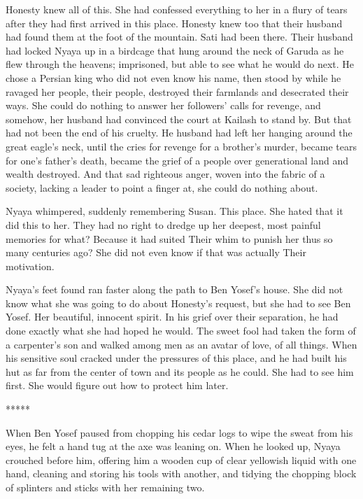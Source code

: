 \documentclass{amsart}
\begin{document}
Honesty knew all of this. She had confessed everything to her in a flury of tears after they had first arrived in this place. Honesty knew too that their husband had found them at the foot of the mountain. Sati had been there. Their husband had locked Nyaya up in a birdcage that hung around the neck of Garuda as he flew through the heavens; imprisoned, but able to see what he would do next. He chose a Persian king who did not even know his name, then stood by while he ravaged her people, their people, destroyed their farmlands and desecrated their ways. She could do nothing to answer her followers' calls for revenge, and somehow, her husband had convinced the court at Kailash to stand by. But that had not been the end of his cruelty. He husband had left her hanging around the great eagle's neck, until the cries for revenge for a brother's murder, became tears for one's father's death, became the grief of a people over generational land and wealth destroyed. And that sad righteous anger, woven into the fabric of a society, lacking a leader to point a finger at, she could do nothing about. 

Nyaya whimpered, suddenly remembering Susan. This place. She hated that it did this to her. They had no right to dredge up her deepest, most painful memories for what? Because it had suited Their whim to punish her thus so many centuries ago? She did not even know if that was actually Their motivation. 

Nyaya's feet found ran faster along the path to Ben Yosef's house. She did not know what she was going to do about Honesty's request, but she had to see Ben Yosef. Her beautiful, innocent spirit. In his grief over their separation, he had done exactly what she had hoped he would. The sweet fool had taken the form of a carpenter’s son and walked among men as an avatar of love, of all things. When his sensitive soul cracked under the pressures of this place, and he had built his hut as far from the center of town and its people as he could. She had to see him first. She would figure out how to protect him later.

\begin{center} ***** \end{center}

When Ben Yosef paused from chopping his cedar logs to wipe the sweat from his eyes, he felt a hand tug at the axe was leaning on. When he looked up, Nyaya crouched before him, offering him a wooden cup of clear yellowish liquid with one hand, cleaning and storing his tools with another, and tidying the chopping block of splinters and sticks with her remaining two. 
\end{document}
